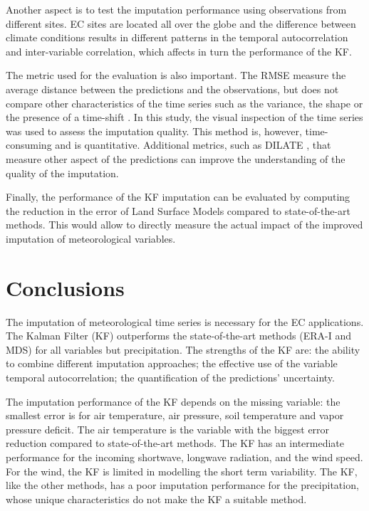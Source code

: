 \documentclass{article}
\let\Oldsection\section
\renewcommand{\section}{\FloatBarrier\Oldsection}
\begin{document}
Another aspect is to test the imputation performance using observations from different sites. EC sites are located all over the globe \cite{pastorello_fluxnet2015_2020} and the difference between climate conditions results in different patterns in the temporal autocorrelation and inter-variable correlation, which affects in turn the performance of the KF.

The metric used for the evaluation is also important. The RMSE measure the average distance between the predictions and the observations, but does not compare other characteristics of the time series such as the variance, the shape or the presence of a time-shift \cite{guen_shape_nodate}. In this study, the visual inspection of the time series was used to assess the imputation quality. This method is, however, time-consuming and is quantitative. Additional metrics, such as DILATE \cite{guen_shape_nodate}, that measure other aspect of the predictions can improve the understanding of the quality of the imputation.

Finally, the performance of the KF imputation can be evaluated by computing the reduction in the error of Land Surface Models compared to state-of-the-art methods. This would allow to directly measure the actual impact of the improved imputation of meteorological variables. 


\section{Conclusions}

The imputation of meteorological time series is necessary for the EC applications. The Kalman Filter (KF) outperforms the state-of-the-art methods (ERA-I and MDS) for all variables but precipitation. The strengths of the KF are: the ability to combine different imputation approaches; the effective use of the variable temporal autocorrelation; the quantification of the predictions' uncertainty. 

The imputation performance of the KF depends on the missing variable: the smallest error is for air temperature, air pressure, soil temperature and vapor pressure deficit. The air temperature is the variable with the biggest error reduction compared to state-of-the-art methods. The KF has an intermediate performance for the incoming shortwave, longwave radiation, and the wind speed. For the wind, the KF is limited in modelling the short term variability. The KF, like the other methods, has a poor imputation performance for the precipitation, whose unique characteristics do not make the KF a suitable method.
\end{document}
